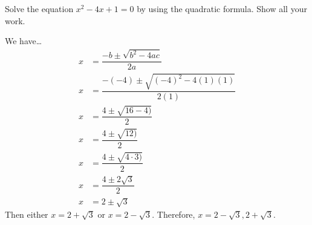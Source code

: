 \documentclass[11pt,letterpaper]{article}
\begin{document}
\newpage





 Solve the equation $x^2 - 4x + 1= 0$ by using the quadratic formula. Show all your work. \pspace

\sol We have\dots \pspace
	\[
	\begin{aligned}
	x&= \dfrac{-b \pm \sqrt{b^2 - 4ac}}{2a} \\[0.3cm]
	x&= \dfrac{-(-4) \pm \sqrt{(-4)^2 - 4(1)(1)}}{2(1)} \\[0.3cm]
	x&= \dfrac{4 \pm \sqrt{16 - 4)}}{2} \\[0.3cm]
	x&= \dfrac{4 \pm \sqrt{12)}}{2} \\[0.3cm]
	x&= \dfrac{4 \pm \sqrt{4 \cdot 3)}}{2} \\[0.3cm]
	x&= \dfrac{4 \pm 2 \sqrt{3}}{2} \\[0.3cm]
	x&= 2 \pm \sqrt{3}
	\end{aligned}
	\] \pspace
Then either $x= 2 + \sqrt{3}$ or $x= 2 - \sqrt{3}$. Therefore, $x= 2 - \sqrt{3}, 2 + \sqrt{3}$. 


\end{document}
